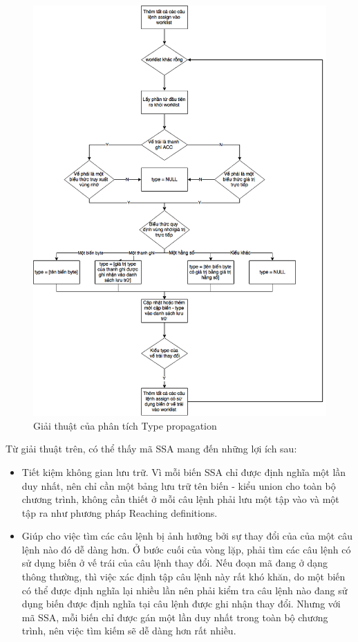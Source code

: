 \begin{figure}[h!]
	\centering
	\includegraphics[width=\linewidth]{image/typePropagationAlgo}
	\caption{Giải thuật của phân tích Type propagation}
	\label{fig:typepropagationalgo}
\end{figure}
Từ giải thuật trên, có thể thấy mã SSA mang đến những lợi ích sau:
\begin{itemize}
	\item Tiết kiệm không gian lưu trữ. Vì mỗi biến SSA chỉ được định nghĩa một lần duy nhất, nên chỉ cần một bảng lưu trữ tên biến - kiểu union cho toàn bộ chương trình, không cần thiết ở mỗi câu lệnh phải lưu một tập vào và một tập ra như phương pháp Reaching definitions.
	\item Giúp cho việc tìm các câu lệnh bị ảnh hưởng bởi sự thay đổi của của một câu lệnh nào đó dễ dàng hơn. Ở bước cuối của vòng lặp, phải tìm các câu lệnh có sử dụng biến ở vế trái của câu lệnh thay đổi. Nếu đoạn mã đang ở dạng thông thường, thì việc xác định tập câu lệnh này rất khó khăn, do một biến có thể được định nghĩa lại nhiều lần nên phải kiểm tra câu lệnh nào đang sử dụng biến được định nghĩa tại câu lệnh được ghi nhận thay đổi. Nhưng với mã SSA, mỗi biến chỉ được gán một lần duy nhất trong toàn bộ chương trình, nên việc tìm kiếm sẽ dễ dàng hơn rất nhiều.
\end{itemize}

